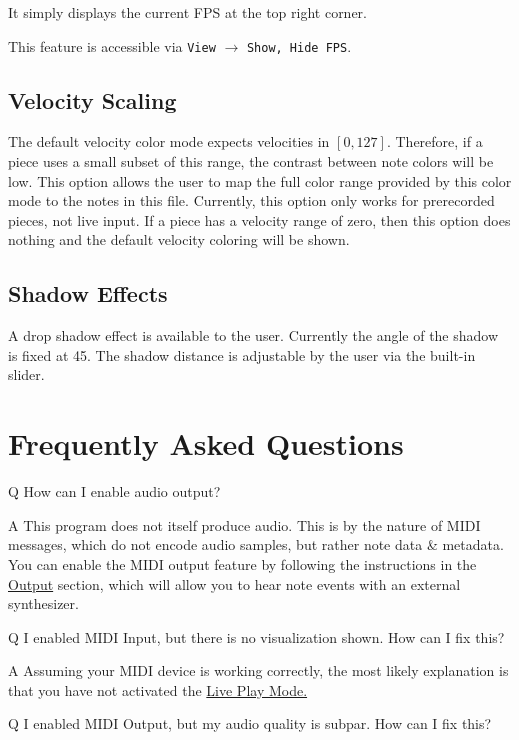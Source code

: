 \documentclass[english]{article}
\newcommand\faqQ[1]{%
  \leavevmode\par
  \noindent
{\hspace{4pt}\Large Q} \raisebox{0.1em}{\textendash{}} {\large #1}\par \vspace{-0.5em}}
\newcommand\faqA[2][]{%
  \leavevmode\par\noindent
  {\leftskip30pt
  {\large A} \raisebox{0.05em}{\textendash{}} \textbf{#1}#2\par \vspace{-0.25em}}}
\providecommand{\mi}[1]{\texttt{#1}}
\begin{document}
It simply displays the current FPS at the top right corner.

This feature is accessible via 
\mi{View} $\rightarrow$ \mi{{Show, Hide} FPS}.

\subsection{Velocity Scaling}

The default velocity color mode expects velocities in $[0, 127]$. Therefore, if a piece uses a small subset of this range,
the contrast between note colors will be low. This option allows the user to map the full color range provided by this
color mode to the notes in this file. Currently, this option only works for prerecorded pieces, not live input.
If a piece has a velocity range of zero, then this option does nothing and the default velocity coloring will
be shown.

\subsection{Shadow Effects}

A drop shadow effect is available to the user. Currently the angle of the shadow is fixed at 45\textdegree. The shadow
distance is adjustable by the user via the built-in slider.

\section{Frequently Asked Questions}

\faqQ{How can I enable audio output?}

\faqA{This program does not itself produce audio. This is by the nature of MIDI messages, which do not encode audio samples,
but rather note data \& metadata. You can enable the MIDI output feature by following the instructions in the 
\textcolor{lcol}{\hyperref[subsec:output]{Output}} section, which will allow you to hear note events with an external
synthesizer.}

\faqQ{I enabled MIDI Input, but there is no visualization shown. How can I fix this?}

\faqA{Assuming your MIDI device is working correctly, the most likely explanation is that you have not activated the
\textcolor{lcol}{\hyperref[subsec:liveplay]{Live Play Mode.}}}

\faqQ{I enabled MIDI Output, but my audio quality is subpar. How can I fix this?}
\end{document}
